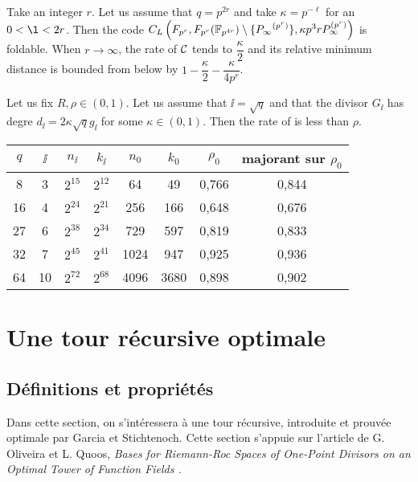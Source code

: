 \documentclass[10pt]{article}
\begin{document}
Take an integer $r$. Let us assume that $q=p^{2r}$ and take $\kappa=p^{-\ell}$ for an $0<\l<2r$. Then the code $C_L\left(F_{p^r},F_{p^r}( \mathbb{F}_{p^{4r}} )\setminus\{ {P_\infty}^{(p^r)} \}, \kappa p^3rP_\infty^{(p^r)}\right)$ is foldable. When $r \rightarrow \infty$, the rate of $\mathcal{C}$ tends to $\dfrac{\kappa}{2}$ and its relative minimum distance is bounded from below by $1-\dfrac{\kappa}{2}-\dfrac{\kappa}{4p^r}$.


\begin{proposition}
	Let us fix $R, \rho \in (0,1)$. Let us assume that $\ii =\sqrt{q}$ and that the divisor $G_{\ii}$ has degre $d_{\ii} = 2\kappa \sqrt{q}g_{\ii}$ for some $\kappa \in (0,1)$.
	Then the rate of  is less than $\rho$.
\end{proposition}




\newpage



\begin{center}
\begin{tabular}{|c|c|c|c|c|c|c|c|}
\hline
$q$ & $\ii$ & $n_{\ii}$ & $k_{\ii}$ & $n_0$ & $k_0$ & $\rho_0$ & majorant sur $\rho_0$ \\ 
\hline
8 & 3 & $2^{15}$ & $2^{12}$ & 64 & 49 & 0,766 & 0,844 \\
\hline
16 & 4 & $2^{24}$ & $2^{21}$ & 256 & 166 & 0,648 & 0,676 \\
\hline
27 & 6 & $2^{38}$ & $2^{34}$ & 729 & 597 & 0,819 & 0,833 \\
\hline
32 & 7 & $2^{45}$ & $2^{41}$ & 1024 & 947 & 0,925 & 0,936 \\
\hline
64 & 10 & $2^{72}$ & $2^{68}$ & 4096 & 3680 & 0,898 & 0,902 \\
\hline
\end{tabular}
\end{center}



\section{Une tour récursive optimale}



\subsection{Définitions et propriétés}



Dans cette section, on s’intéressera à une tour récursive, introduite et prouvée optimale par Garcia et Stichtenoch. Cette section s'appuie sur l'article de G. Oliveira et L. Quoos, \it{Bases for Riemann-Roc Spaces of One-Point Divisors on an Optimal Tower of Function Fields} \rm.






\end{document}
